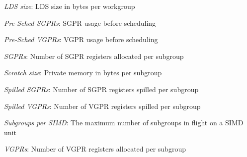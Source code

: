 \noindent\textit{LDS size}: LDS size in bytes per workgroup\par
\noindent\textit{Pre-Sched SGPRs}: SGPR usage before scheduling\par
\noindent\textit{Pre-Sched VGPRs}: VGPR usage before scheduling\par
\noindent\textit{SGPRs}: Number of SGPR registers allocated per subgroup\par
\noindent\textit{Scratch size}: Private memory in bytes per subgroup\par
\noindent\textit{Spilled SGPRs}: Number of SGPR registers spilled per subgroup\par
\noindent\textit{Spilled VGPRs}: Number of VGPR registers spilled per subgroup\par
\noindent\textit{Subgroups per SIMD}: The maximum number of subgroups in flight on a SIMD unit\par
\noindent\textit{VGPRs}: Number of VGPR registers allocated per subgroup\par
